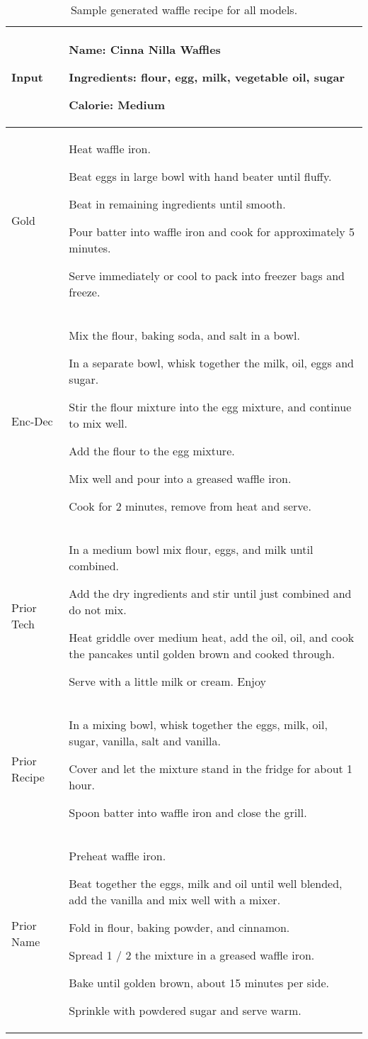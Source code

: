 \documentclass[11pt,a4paper]{article}
\begin{document}
\begin{table*}[t!]
\begin{tabularx}{\linewidth}{ l X }
\toprule
Input                   & \textbf{Name:} Cinna Nilla Waffles

\textbf{Ingredients:} flour, egg, milk, vegetable oil, sugar

\textbf{Calorie:} Medium \\ \midrule
Gold                    & Heat waffle iron.

Beat eggs in large bowl with hand beater until fluffy.

Beat in remaining ingredients until smooth.

Pour batter into waffle iron and cook for approximately 5 minutes. 

Serve immediately or cool to pack into freezer bags and freeze. \\ \midrule
Enc-Dec                 & Mix the flour, baking soda, and salt in a bowl.

In a separate bowl, whisk together the milk, oil, eggs and sugar.

Stir the flour mixture into the egg mixture, and continue to mix well.

Add the flour to the egg mixture.

Mix well and pour into a greased waffle iron.

Cook for 2 minutes, remove from heat and serve.   \\ \midrule
Prior Tech        & In a medium bowl mix flour, eggs, and milk until combined.

Add the dry ingredients and stir until just combined and do not mix.

Heat griddle over medium heat, add the oil, oil, and cook the pancakes until golden brown and cooked through.

Serve with a little milk or cream. Enjoy   \\ \midrule
Prior Recipe   & In a mixing bowl, whisk together the eggs, milk, oil, sugar, vanilla, salt and vanilla.
                                                              
Cover and let the mixture stand in the fridge for about 1 hour.

Spoon batter into waffle iron and close the grill.  \\ \midrule
Prior Name     & Preheat waffle iron.

Beat together the eggs, milk and oil until well blended, add the vanilla and mix well with a mixer.

Fold in flour, baking powder, and cinnamon.

Spread 1 / 2 the mixture in a greased waffle iron.

Bake until golden brown, about 15 minutes per side.

Sprinkle with powdered sugar and serve warm.
 \\\bottomrule
\end{tabularx}
\caption{Sample generated waffle recipe for all models.}
\label{tab:sample_waffle}
\end{table*}
\end{document}
